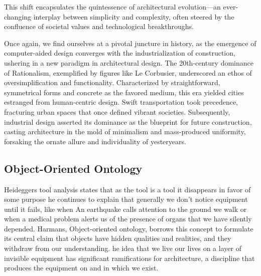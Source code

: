 This shift encapsulates the quintessence of architectural evolution—an ever-changing interplay between simplicity and complexity, often steered by the confluence of societal values and technological breakthroughs.


Once again, we find ourselves at a pivotal juncture in history, as the emergence of computer-aided design converges with the industrialization of construction, ushering in a new paradigm in architectural design.
The 20th-century dominance of Rationalism, exemplified by figures like Le Corbusier, underscored an ethos of oversimplification and functionality.
Characterized by straightforward, symmetrical forms and concrete as the favored medium, this era yielded cities estranged from human-centric design.
Swift transportation took precedence, fracturing urban spaces that once defined vibrant societies\cite{Stacbond2020}.
Subsequently, industrial design asserted its dominance as the blueprint for future construction\cite{Economakis2023}, casting architecture in the mold of minimalism and mass-produced uniformity, forsaking the ornate allure and individuality of yesteryears.

\subsection{Object-Oriented Ontology}
\label{subsec:ObjectOrientedOntology}
Heideggers tool analysis states that as the tool is a tool it disappears in favor of some purpose he continues to explain that generally we don't notice equipment until it fails, like when An earthquake calls attention to the ground we walk or when a medical problem alerts us of the presence of organs that we have silently depended\cite{Harman2011}.
Harmans, Object-oriented ontology, borrows this concept to formulate its central claim that objects have hidden qualities and realities, and they withdraw from our understanding.\cite{Gage2015}
he idea that we live our lives on a layer of invisible equipment has significant ramifications for architecture, a discipline that produces the equipment on and in which we exist.\cite{Gage2015}
